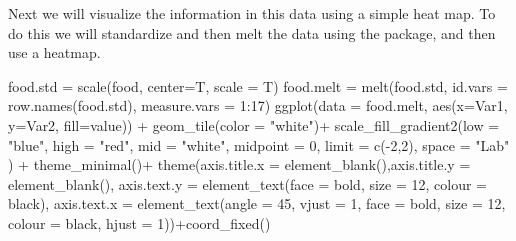 \documentclass[
]{article}
\newenvironment{Shaded}{\begin{snugshade}}{\end{snugshade}}
\newcommand{\AttributeTok}[1]{\textcolor[rgb]{0.77,0.63,0.00}{#1}}
\newcommand{\DecValTok}[1]{\textcolor[rgb]{0.00,0.00,0.81}{#1}}
\newcommand{\FunctionTok}[1]{\textcolor[rgb]{0.00,0.00,0.00}{#1}}
\newcommand{\NormalTok}[1]{#1}
\newcommand{\OtherTok}[1]{\textcolor[rgb]{0.56,0.35,0.01}{#1}}
\newcommand{\SpecialCharTok}[1]{\textcolor[rgb]{0.00,0.00,0.00}{#1}}
\newcommand{\StringTok}[1]{\textcolor[rgb]{0.31,0.60,0.02}{#1}}
\theoremstyle{definition}
\theoremstyle{definition}
\theoremstyle{definition}
\theoremstyle{definition}
\theoremstyle{remark}
\begin{document}
Next we will visualize the information in this data using a simple heat map. To do this we will standardize and then melt the data using the  package, and then use a  heatmap.

\begin{Shaded}
\begin{Highlighting}[]
\NormalTok{food.std }\OtherTok{=} \FunctionTok{scale}\NormalTok{(food, }\AttributeTok{center=}\NormalTok{T, }\AttributeTok{scale =}\NormalTok{ T)}
\NormalTok{food.melt }\OtherTok{=} \FunctionTok{melt}\NormalTok{(food.std, }\AttributeTok{id.vars =} \FunctionTok{row.names}\NormalTok{(food.std), }\AttributeTok{measure.vars =} \DecValTok{1}\SpecialCharTok{:}\DecValTok{17}\NormalTok{)}
\FunctionTok{ggplot}\NormalTok{(}\AttributeTok{data =}\NormalTok{ food.melt, }\FunctionTok{aes}\NormalTok{(}\AttributeTok{x=}\NormalTok{Var1, }\AttributeTok{y=}\NormalTok{Var2, }\AttributeTok{fill=}\NormalTok{value)) }\SpecialCharTok{+} 
  \FunctionTok{geom\_tile}\NormalTok{(}\AttributeTok{color =} \StringTok{"white"}\NormalTok{)}\SpecialCharTok{+}
  \FunctionTok{scale\_fill\_gradient2}\NormalTok{(}\AttributeTok{low =} \StringTok{"blue"}\NormalTok{, }\AttributeTok{high =} \StringTok{"red"}\NormalTok{, }\AttributeTok{mid =} \StringTok{"white"}\NormalTok{, }
                       \AttributeTok{midpoint =} \DecValTok{0}\NormalTok{, }\AttributeTok{limit =} \FunctionTok{c}\NormalTok{(}\SpecialCharTok{{-}}\DecValTok{2}\NormalTok{,}\DecValTok{2}\NormalTok{), }\AttributeTok{space =} \StringTok{"Lab"} 
\NormalTok{                       ) }\SpecialCharTok{+}  \FunctionTok{theme\_minimal}\NormalTok{()}\SpecialCharTok{+} 
  \FunctionTok{theme}\NormalTok{(}\AttributeTok{axis.title.x =} \FunctionTok{element\_blank}\NormalTok{(),}\AttributeTok{axis.title.y =} \FunctionTok{element\_blank}\NormalTok{(),}
        \AttributeTok{axis.text.y =} \FunctionTok{element\_text}\NormalTok{(}\AttributeTok{face =} \StringTok{\textquotesingle{}bold\textquotesingle{}}\NormalTok{, }\AttributeTok{size =} \DecValTok{12}\NormalTok{, }\AttributeTok{colour =} \StringTok{\textquotesingle{}black\textquotesingle{}}\NormalTok{),}
        \AttributeTok{axis.text.x =} \FunctionTok{element\_text}\NormalTok{(}\AttributeTok{angle =} \DecValTok{45}\NormalTok{, }\AttributeTok{vjust =} \DecValTok{1}\NormalTok{, }\AttributeTok{face =} \StringTok{\textquotesingle{}bold\textquotesingle{}}\NormalTok{,}
                                   \AttributeTok{size =} \DecValTok{12}\NormalTok{, }\AttributeTok{colour =} \StringTok{\textquotesingle{}black\textquotesingle{}}\NormalTok{, }\AttributeTok{hjust =} \DecValTok{1}\NormalTok{))}\SpecialCharTok{+}\FunctionTok{coord\_fixed}\NormalTok{()}
\end{Highlighting}
\end{Shaded}
\end{document}
